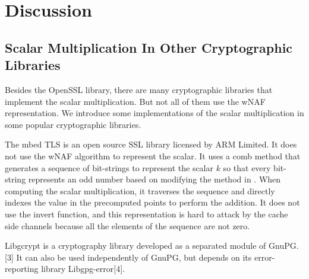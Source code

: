 \section{Discussion}
\label{sec:discussion}

\subsection{Scalar Multiplication In Other Cryptographic Libraries}
Besides the OpenSSL library, there are many cryptographic libraries that implement the scalar multiplication.
But not all of them use the wNAF representation.
We introduce some implementations of the scalar multiplication in some popular cryptographic libraries.

The mbed TLS \cite{polarssl} is an open source SSL library licensed by ARM Limited.
It does not use the wNAF algorithm to represent the scalar.
It uses a comb method that generates a sequence of bit-strings to represent the scalar $k$ so that every bit-string represents an odd number based on modifying the method in \cite{Hedabou2004ACM}.
When computing the scalar multiplication, it traverses the sequence and directly indexes the value in the precomputed points to perform the addition.
It does not use the invert function, 
and this representation is hard to attack by the cache side channels because all the elements of the sequence are not zero. 

Libgcrypt is a cryptography library developed as a separated module of GnuPG.[3] It can also be used independently of GnuPG, but depends on its error-reporting library Libgpg-error[4].




